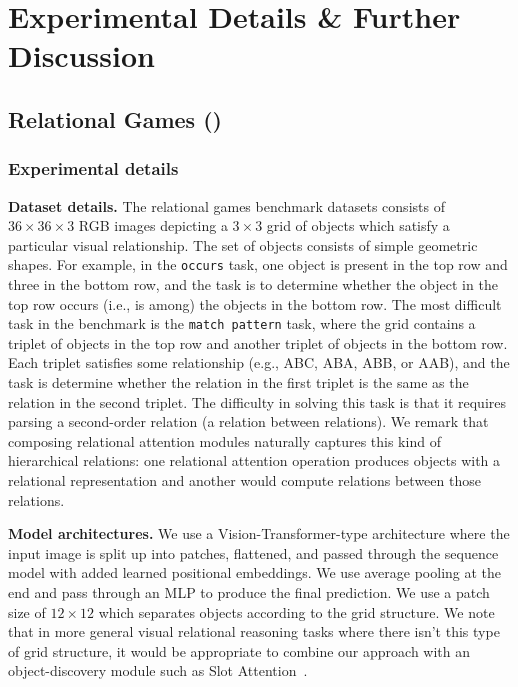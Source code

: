 \section{Experimental Details \& Further Discussion}\label{sec:appendix_experimental_details}

\subsection{Relational Games ()}\label{ssec:appendxi_relgames}

\subsubsection*{Experimental details}

\textbf{Dataset details.} The relational games benchmark datasets consists of $36 \times 36 \times 3$ RGB images depicting a $3 \times 3$ grid of objects which satisfy a particular visual relationship. The set of objects consists of simple geometric shapes. For example, in the \texttt{occurs} task, one object is present in the top row and three in the bottom row, and the task is to determine whether the object in the top row occurs (i.e., is among) the objects in the bottom row. The most difficult task in the benchmark is the \texttt{match pattern} task, where the grid contains a triplet of objects in the top row and another triplet of objects in the bottom row. Each triplet satisfies some relationship (e.g., ABC, ABA, ABB, or AAB), and the task is determine whether the relation in the first triplet is the same as the relation in the second triplet. The difficulty in solving this task is that it requires parsing a second-order relation (a relation between relations). We remark that composing relational attention modules naturally captures this kind of hierarchical relations: one relational attention operation produces objects with a relational representation and another would compute relations between those relations.

\textbf{Model architectures.} We use a Vision-Transformer-type architecture where the input image is split up into patches, flattened, and passed through the sequence model with added learned positional embeddings. We use average pooling at the end and pass through an MLP to produce the final prediction. We use a patch size of $12 \times 12$ which separates objects according to the grid structure. We note that in more general visual relational reasoning tasks where there isn't this type of grid structure, it would be appropriate to combine our approach with an object-discovery module such as Slot Attention~\citep{locatelloObjectCentricLearningSlot2020}.

